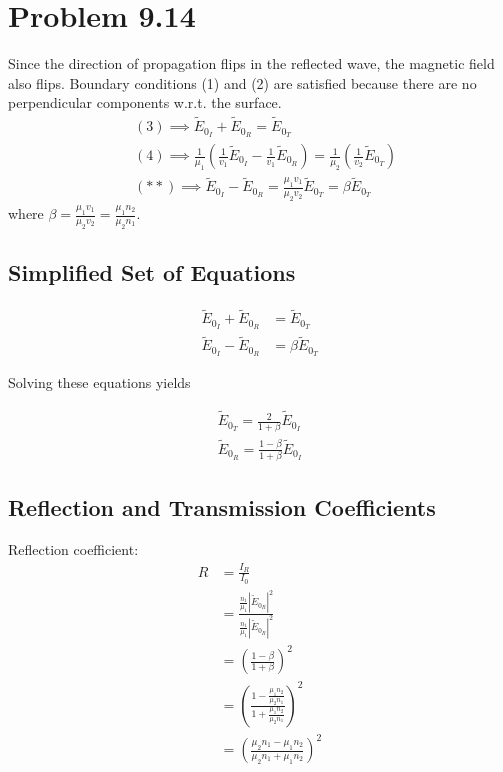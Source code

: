 \documentclass[12pt]{article}
\newcommand{\enterProblemHeader}[1]{
	\rhead{#1}
}
\newenvironment{homeworkProblem}[1]{
    \section{Problem #1}
    \enterProblemHeader{#1}
}{
	\pagebreak
}
\begin{document}
\begin{homeworkProblem}{9.14}
	Since the direction of propagation flips in the reflected wave, the magnetic
	field also flips. Boundary conditions (1) and (2) are satisfied because
	there are no perpendicular components w.r.t. the surface.
	\begin{align*}
		&(3) \implies \tilde E_{0_I} + \tilde E_{0_R} = \tilde E_{0_T}
		\tag{$*$}\\
		&(4) \implies \frac 1 {\mu_1} \left( \frac 1 {v_1} \tilde E_{0_I} - \frac
		1 {v_1} \tilde E_{0_R} \right) = \frac 1 {\mu_2} \left( \frac 1 {v_2}
		\tilde E_{0_T} \right) \tag{$**$}\\
		&(**) \implies \tilde E_{0_I} - \tilde E_{0_R} = \frac {\mu_1 v_1} {\mu_2
		v_2} \tilde E_{0_T} = \beta \tilde E_{0_T}
	\end{align*}
	where $\beta = \frac {\mu_1 v_1} {\mu_2 v_2} = \frac {\mu_1 n_2} {\mu_2
	n_1}$.

	\subsection{Simplified Set of Equations}

	\begin{align*}
		\tilde E_{0_I} + \tilde E_{0_R} &= \tilde E_{0_T}\\
		\tilde E_{0_I} - \tilde E_{0_R} &= \beta \tilde E_{0_T}
	\end{align*}

	Solving these equations yields

	\begin{align*}
		\tilde E_{0_T} = \frac 2 {1 + \beta} \tilde E_{0_I}\\
		\tilde E_{0_R} = \frac {1 - \beta} {1 + \beta} \tilde E_{0_I}
	\end{align*}

	\subsection{Reflection and Transmission Coefficients}

	Reflection coefficient:
	\begin{align*}
		R &= \frac {I_R} {I_0}\\
		&= \frac { \frac {n_1} {\mu_1} | \tilde E_{0_R} |^2 } { \frac {n_1}
		{\mu_1} | \tilde E_{0_R} |^2 }\\
		&= \left( \frac {1 - \beta} {1 + \beta} \right)^2\\
		&= \left( \frac {1 - \frac {\mu_1 n_2} {\mu_2 n_1}} {1 + \frac {\mu_1
		n_2} {\mu_2 n_1}} \right)^2\\
		&= \left( \frac {\mu_2 n_1 - \mu_1 n_2} {\mu_2 n_1 + \mu_1 n_2}
		\right)^2\\
	\end{align*}


\end{homeworkProblem}
\end{document}
